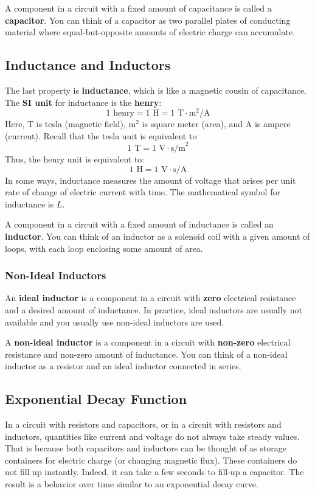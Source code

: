A component in a circuit with a fixed amount of capacitance is called a \textbf{capacitor}. You can think of a capacitor as two parallel plates of conducting material where equal-but-opposite amounts of electric charge can accumulate.
%
\subsection{Inductance and Inductors}
%
The last property is \textbf{inductance}, which is like a magnetic cousin of capacitance. The \textbf{SI unit} for inductance is the \textbf{henry}:
\begin{equation}
	1 \text{ henry} = 1 \text{ H} = 1 \text{ T}\cdot\text{m}^{2}\text{/A}
\end{equation}
Here, T is tesla (magnetic field), m$^{2}$ is square meter (area), and A is ampere (current). Recall that the tesla unit is equivalent to
\begin{equation}
    1 \text{ T} = 1 \text{ V} \cdot \text{s/m}^{2}
\end{equation}
Thus, the henry unit is equivalent to:
\begin{equation}
    1 \text{ H} = 1 \text{ V}\cdot\text{s/A}
\end{equation}
In some ways, inductance measures the amount of voltage that arises per unit rate of change of electric current with time. The mathematical symbol for inductance is $L$.

A component in a circuit with a fixed amount of inductance is called an \textbf{inductor}. You can think of an inductor as a solenoid coil with a given amount of loops, with each loop enclosing some amount of area.
%
\subsubsection{Non-Ideal Inductors}
%
An \textbf{ideal inductor} is a component in a circuit with \textbf{zero} electrical resistance and a desired amount of inductance. In practice, ideal inductors are usually not available and you usually use non-ideal inductors are used.

A \textbf{non-ideal inductor} is a component in a circuit with \textbf{non-zero} electrical resistance and non-zero amount of inductance. You can think of a non-ideal inductor as a resistor and an ideal inductor connected in series.
%
\subsection{Exponential Decay Function}
%
In a circuit with resistors and capacitors, or in a circuit with resistors and inductors, quantities like current and voltage do not always take steady values. That is because both capacitors and inductors can be thought of as storage containers for electric charge (or changing magnetic flux). These containers do not fill up instantly. Indeed, it can take a few seconds to fill-up a capacitor. The result is a behavior over time similar to an exponential decay curve.

